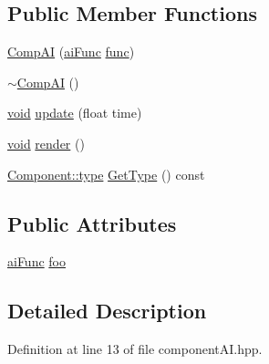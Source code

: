 \subsection*{Public Member Functions}
\begin{DoxyCompactItemize}
\item 
\hyperlink{class_comp_a_i_aa536df2cdcb07d0b5cda9bd28cb5881c}{Comp\-A\-I} (\hyperlink{component_a_i_8hpp_a19457b91cecac85b8e78aa227c222bf7}{ai\-Func} \hyperlink{_s_d_l__opengl__glext_8h_a18ae3ab36a07e388833b568cfdfa90c8}{func})
\item 
\hyperlink{class_comp_a_i_af5fa69e268f8014a06f1d833b7674c9a}{$\sim$\-Comp\-A\-I} ()
\item 
\hyperlink{_s_d_l__opengles2__gl2ext_8h_ae5d8fa23ad07c48bb609509eae494c95}{void} \hyperlink{class_comp_a_i_a24c424b8be6b67a470d89a0fa781c866}{update} (float time)
\item 
\hyperlink{_s_d_l__opengles2__gl2ext_8h_ae5d8fa23ad07c48bb609509eae494c95}{void} \hyperlink{class_comp_a_i_afd0228f41ea5612976f08ffbcdef632a}{render} ()
\item 
\hyperlink{class_component_ad6d161b6acf7b843b55bb9feac7af71a}{Component\-::type} \hyperlink{class_comp_a_i_ab94fe24642c71cc2c61fe13b89b4b84c}{Get\-Type} () const 
\end{DoxyCompactItemize}
\subsection*{Public Attributes}
\begin{DoxyCompactItemize}
\item 
\hyperlink{component_a_i_8hpp_a19457b91cecac85b8e78aa227c222bf7}{ai\-Func} \hyperlink{class_comp_a_i_a7b639e7a28a8b449e35c82032bfb7637}{foo}
\end{DoxyCompactItemize}


\subsection{Detailed Description}


Definition at line 13 of file component\-A\-I.\-hpp.



